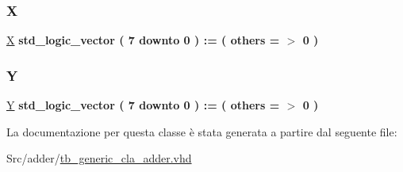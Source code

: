 \subsubsection{\texorpdfstring{X}{X}}
{\footnotesize\ttfamily \hyperlink{classtb__generic__cla__adder_1_1behavior_a60ae79202e8be952cf4f6d017cc743f1}{X} {\bfseries \textcolor{vhdlchar}{std\+\_\+logic\+\_\+vector}\textcolor{vhdlchar}{ }\textcolor{vhdlchar}{(}\textcolor{vhdlchar}{ }\textcolor{vhdlchar}{ } \textcolor{vhdldigit}{7} \textcolor{vhdlchar}{ }\textcolor{vhdlchar}{downto}\textcolor{vhdlchar}{ }\textcolor{vhdlchar}{ } \textcolor{vhdldigit}{0} \textcolor{vhdlchar}{ }\textcolor{vhdlchar}{)}\textcolor{vhdlchar}{ }\textcolor{vhdlchar}{ }\textcolor{vhdlchar}{ }\textcolor{vhdlchar}{\+:}\textcolor{vhdlchar}{=}\textcolor{vhdlchar}{ }\textcolor{vhdlchar}{(}\textcolor{vhdlchar}{ }\textcolor{vhdlchar}{ }\textcolor{vhdlchar}{others}\textcolor{vhdlchar}{ }\textcolor{vhdlchar}{ }\textcolor{vhdlchar}{=}\textcolor{vhdlchar}{ }\textcolor{vhdlchar}{$>$}\textcolor{vhdlchar}{ }\textcolor{vhdlchar}{\textquotesingle{}}\textcolor{vhdlchar}{ } \textcolor{vhdldigit}{0} \textcolor{vhdlchar}{ }\textcolor{vhdlchar}{\textquotesingle{}}\textcolor{vhdlchar}{ }\textcolor{vhdlchar}{)}\textcolor{vhdlchar}{ }} \hspace{0.3cm}{\ttfamily [Signal]}}

\mbox{\label{classtb__generic__cla__adder_1_1behavior_a90a36bc161877c328423b965fab6bd93}} 
\subsubsection{\texorpdfstring{Y}{Y}}
{\footnotesize\ttfamily \hyperlink{classtb__generic__cla__adder_1_1behavior_a90a36bc161877c328423b965fab6bd93}{Y} {\bfseries \textcolor{vhdlchar}{std\+\_\+logic\+\_\+vector}\textcolor{vhdlchar}{ }\textcolor{vhdlchar}{(}\textcolor{vhdlchar}{ }\textcolor{vhdlchar}{ } \textcolor{vhdldigit}{7} \textcolor{vhdlchar}{ }\textcolor{vhdlchar}{downto}\textcolor{vhdlchar}{ }\textcolor{vhdlchar}{ } \textcolor{vhdldigit}{0} \textcolor{vhdlchar}{ }\textcolor{vhdlchar}{)}\textcolor{vhdlchar}{ }\textcolor{vhdlchar}{ }\textcolor{vhdlchar}{ }\textcolor{vhdlchar}{\+:}\textcolor{vhdlchar}{=}\textcolor{vhdlchar}{ }\textcolor{vhdlchar}{(}\textcolor{vhdlchar}{ }\textcolor{vhdlchar}{ }\textcolor{vhdlchar}{others}\textcolor{vhdlchar}{ }\textcolor{vhdlchar}{ }\textcolor{vhdlchar}{=}\textcolor{vhdlchar}{ }\textcolor{vhdlchar}{$>$}\textcolor{vhdlchar}{ }\textcolor{vhdlchar}{\textquotesingle{}}\textcolor{vhdlchar}{ } \textcolor{vhdldigit}{0} \textcolor{vhdlchar}{ }\textcolor{vhdlchar}{\textquotesingle{}}\textcolor{vhdlchar}{ }\textcolor{vhdlchar}{)}\textcolor{vhdlchar}{ }} \hspace{0.3cm}{\ttfamily [Signal]}}



La documentazione per questa classe è stata generata a partire dal seguente file\+:\begin{DoxyCompactItemize}
\item 
Src/adder/\hyperlink{tb__generic__cla__adder_8vhd}{tb\+\_\+generic\+\_\+cla\+\_\+adder.\+vhd}\end{DoxyCompactItemize}
